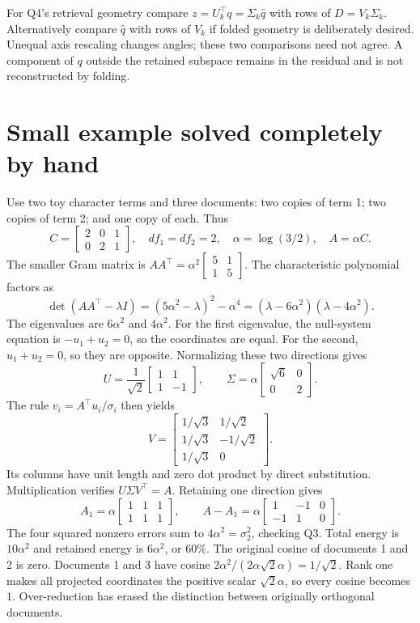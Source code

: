 \documentclass[11pt]{article}
\begin{document}
For Q4's retrieval geometry compare $z=U_k^\top q=\Sigma_k\widehat q$ with rows
of $D=V_k\Sigma_k$. Alternatively compare $\widehat q$ with rows of $V_k$ if
folded geometry is deliberately desired. Unequal axis rescaling changes angles;
these two comparisons need not agree. A component of $q$ outside the retained
subspace remains in the residual and is not reconstructed by folding.

\section{Small example solved completely by hand}
Use two toy character terms and three documents: two copies of term 1; two copies
of term 2; and one copy of each. Thus
\[
C=\begin{bmatrix}2&0&1\\0&2&1\end{bmatrix},\quad df_1=df_2=2,
\quad\alpha=\log(3/2),\quad A=\alpha C.
\]
The smaller Gram matrix is
$AA^\top=\alpha^2\begin{bmatrix}5&1\\1&5\end{bmatrix}$.
The characteristic polynomial factors as
\[
\det(AA^\top-\lambda I)=(5\alpha^2-\lambda)^2-\alpha^4
=(\lambda-6\alpha^2)(\lambda-4\alpha^2).
\]
The eigenvalues are $6\alpha^2$ and $4\alpha^2$. For the first eigenvalue,
the null-system equation is $-u_1+u_2=0$, so the coordinates are equal.
For the second, $u_1+u_2=0$, so they are opposite. Normalizing these two
directions gives
\[
U=\frac1{\sqrt2}\begin{bmatrix}1&1\\1&-1\end{bmatrix},\qquad
\Sigma=\alpha\begin{bmatrix}\sqrt6&0\\0&2\end{bmatrix}.
\]
The rule $v_i=A^\top u_i/\sigma_i$ then yields
\[
V=\begin{bmatrix}1/\sqrt3&1/\sqrt2\\1/\sqrt3&-1/\sqrt2\\1/\sqrt3&0\end{bmatrix}.
\]
Its columns have unit length and zero dot product by direct substitution.
Multiplication verifies $U\Sigma V^\top=A$. Retaining one direction gives
\[
A_1=\alpha\begin{bmatrix}1&1&1\\1&1&1\end{bmatrix},\qquad
A-A_1=\alpha\begin{bmatrix}1&-1&0\\-1&1&0\end{bmatrix}.
\]
The four squared nonzero errors sum to $4\alpha^2=\sigma_2^2$, checking Q3.
Total energy is $10\alpha^2$ and retained energy is $6\alpha^2$, or $60\%$.
The original cosine of documents 1 and 2 is zero. Documents 1 and 3 have cosine
$2\alpha^2/(2\alpha\sqrt2\alpha)=1/\sqrt2$. Rank one makes all projected
coordinates the positive scalar $\sqrt2\alpha$, so every cosine becomes $1$.
Over-reduction has erased the distinction between originally orthogonal documents.
\end{document}
